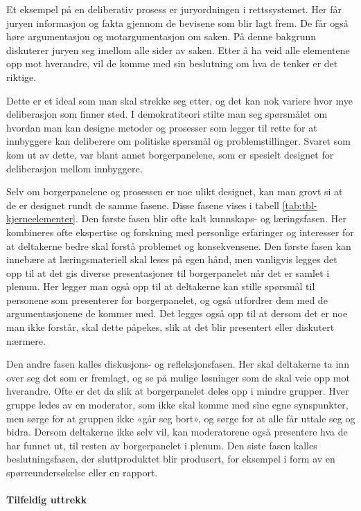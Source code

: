\documentclass[
  12pt,
  a4paper, 12pt]{article}
\begin{document}
Et eksempel på en deliberativ prosess er juryordningen i rettssystemet. Her får juryen informasjon og fakta gjennom de bevisene som blir lagt frem. De får også høre argumentasjon og motargumentasjon om saken. På denne bakgrunn diskuterer juryen seg imellom alle sider av saken. Etter å ha veid alle elementene opp mot hverandre, vil de komme med sin beslutning om hva de tenker er det riktige.

Dette er et ideal som man skal strekke seg etter, og det kan nok variere hvor mye deliberasjon som finner sted. I demokratiteori stilte man seg spørsmålet om hvordan man kan designe metoder og prosesser som legger til rette for at innbyggere kan deliberere om politiske spørsmål og problemstillinger. Svaret som kom ut av dette, var blant annet borgerpanelene, som er spesielt designet for deliberasjon mellom innbyggere.

Selv om borgerpanelene og prosessen er noe ulikt designet, kan man grovt si at de er designet rundt de samme fasene. Disse fasene vises i tabell \ref{tab:tbl-kjerneelementer}. Den første fasen blir ofte kalt kunnskaps- og læringsfasen. Her kombineres ofte ekspertise og forskning med personlige erfaringer og interesser for at deltakerne bedre skal forstå problemet og konsekvensene. Den første fasen kan innebære at læringsmateriell skal leses på egen hånd, men vanligvis legges det opp til at det gis diverse presentasjoner til borgerpanelet når det er samlet i plenum. Her legger man også opp til at deltakerne kan stille spørsmål til personene som presenterer for borgerpanelet, og også utfordrer dem med de argumentasjonene de kommer med. Det legges også opp til at dersom det er noe man ikke forstår, skal dette påpekes, slik at det blir presentert eller diskutert nærmere.

Den andre fasen kalles diskusjons- og refleksjonsfasen. Her skal deltakerne ta inn over seg det som er fremlagt, og se på mulige løsninger som de skal veie opp mot hverandre. Ofte er det da slik at borgerpanelet deles opp i mindre grupper. Hver gruppe ledes av en moderator, som ikke skal komme med sine egne synspunkter, men sørge for at gruppen ikke «går seg bort», og sørge for at alle får uttale seg og bidra. Dersom deltakerne ikke selv vil, kan moderatorene også presentere hva de har funnet ut, til resten av borgerpanelet i plenum.
Den siste fasen kalles beslutningsfasen, der sluttproduktet blir produsert, for eksempel i form av en spørreundersøkelse eller en rapport.

\hypertarget{tilfeldig-uttrekk}{%
\paragraph{Tilfeldig uttrekk}\label{tilfeldig-uttrekk}}
\end{document}
